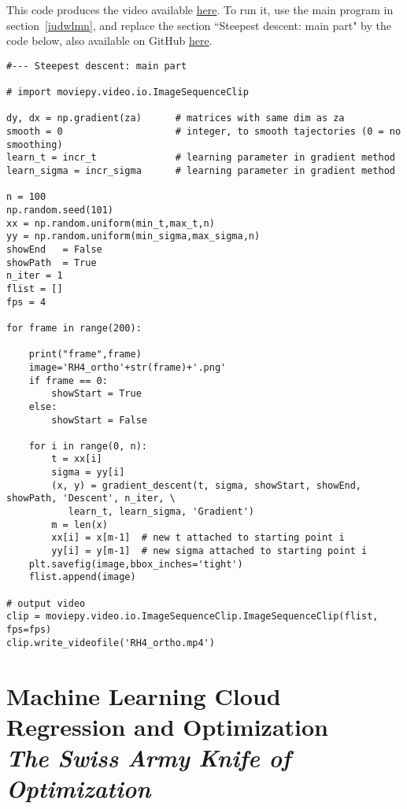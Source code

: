 \documentclass[oneside,10pt]{book}
\newcommand\Chapter[2]{
  \chapter[#1]{#1\\[2ex]\Large\itshape#2}
}
\begin{document}
This code produces the video available \href{https://www.youtube.com/watch?v=pqQsLpPkvbw}{here}. To run it, use the main program in section~\ref{iudwlmn}, and replace the section
``Steepest descent: main part" by the code below, also available on GitHub \href{https://github.com/VincentGranville/Experimental-Math-Number-Theory/blob/main/Source-Code/gradient_animated.py}{here}.\vspace{1ex}

\begin{lstlisting}
#--- Steepest descent: main part

# import moviepy.video.io.ImageSequenceClip

dy, dx = np.gradient(za)      # matrices with same dim as za
smooth = 0                    # integer, to smooth tajectories (0 = no smoothing)
learn_t = incr_t              # learning parameter in gradient method
learn_sigma = incr_sigma      # learning parameter in gradient method

n = 100
np.random.seed(101)
xx = np.random.uniform(min_t,max_t,n)
yy = np.random.uniform(min_sigma,max_sigma,n)
showEnd   = False
showPath  = True
n_iter = 1
flist = []
fps = 4

for frame in range(200):

    print("frame",frame)
    image='RH4_ortho'+str(frame)+'.png'
    if frame == 0:
        showStart = True
    else:
        showStart = False

    for i in range(0, n):
        t = xx[i]
        sigma = yy[i]
        (x, y) = gradient_descent(t, sigma, showStart, showEnd, showPath, 'Descent', n_iter, \
           learn_t, learn_sigma, 'Gradient')
        m = len(x)
        xx[i] = x[m-1]  # new t attached to starting point i
        yy[i] = y[m-1]  # new sigma attached to starting point i
    plt.savefig(image,bbox_inches='tight')
    flist.append(image)

# output video
clip = moviepy.video.io.ImageSequenceClip.ImageSequenceClip(flist, fps=fps)
clip.write_videofile('RH4_ortho.mp4')
\end{lstlisting}


\Chapter{Machine Learning Cloud Regression and Optimization}{The Swiss Army Knife of Optimization} \label{chap1v}
\end{document}
